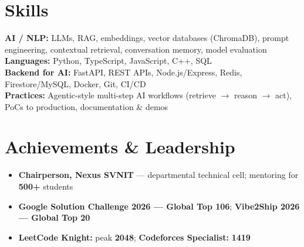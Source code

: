 \documentclass[a4paper,10pt]{article}
\begin{document}
\section{Skills}
\noindent\small
\textbf{AI / NLP:} LLMs, RAG, embeddings, vector databases (ChromaDB), prompt engineering, contextual retrieval, conversation memory, model evaluation \\[0.5mm]
\textbf{Languages:} Python, TypeScript, JavaScript, C++, SQL \\[0.5mm]
\textbf{Backend for AI:} FastAPI, REST APIs, Node.js/Express, Redis, Firestore/MySQL, Docker, Git, CI/CD \\[0.5mm]
\textbf{Practices:} Agentic-style multi-step AI workflows (retrieve $\rightarrow$ reason $\rightarrow$ act), PoCs to production, documentation \& demos

\section{Achievements \& Leadership}
\begin{itemize}
  \item \textbf{Chairperson, Nexus SVNIT} --- departmental technical cell; mentoring for \textbf{500+} students
  \item \textbf{Google Solution Challenge 2026 --- Global Top 106}; \textbf{Vibe2Ship 2026 --- Global Top 20}
  \item \textbf{LeetCode Knight:} peak \textbf{2048}; \textbf{Codeforces Specialist:} \textbf{1419}
\end{itemize}
\end{document}
